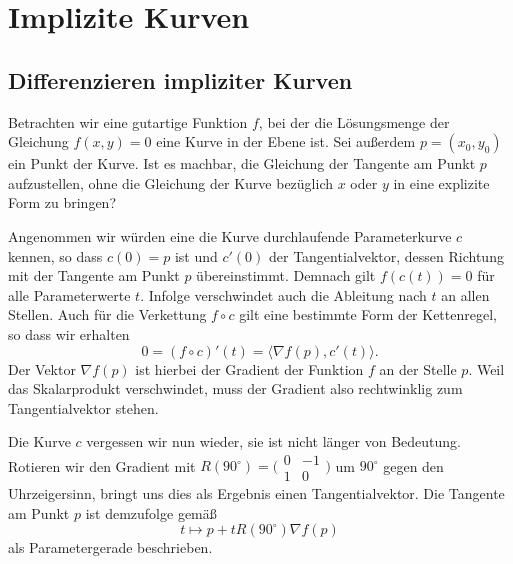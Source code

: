 \newpage
\section{Implizite Kurven}
\subsection{Differenzieren impliziter Kurven}

Betrachten wir eine gutartige Funktion $f$, bei der die Lösungsmenge
der Gleichung $f(x,y)=0$ eine Kurve in der Ebene ist. Sei außerdem
$p=(x_0,y_0)$ ein Punkt der Kurve. Ist es machbar, die Gleichung
der Tangente am Punkt $p$ aufzustellen, ohne die Gleichung der Kurve
bezüglich $x$ oder $y$ in eine explizite Form zu bringen?

Angenommen wir würden eine die Kurve durchlaufende Parameterkurve
$c$ kennen, so dass $c(0)=p$ ist und $c'(0)$ der Tangentialvektor,
dessen Richtung mit der Tangente am Punkt $p$ übereinstimmt.
Demnach gilt $f(c(t))=0$ für alle Parameterwerte $t$. Infolge
verschwindet auch die Ableitung nach $t$ an allen Stellen. Auch
für die Verkettung $f\circ c$ gilt eine bestimmte Form der
Kettenregel, so dass wir erhalten%
\begin{equation}
0 = (f\circ c)'(t) = \langle\nabla f(p), c'(t)\rangle.
\end{equation}
Der Vektor $\nabla f(p)$ ist hierbei der Gradient der Funktion
$f$ an der Stelle $p$. Weil das Skalarprodukt verschwindet,
muss der Gradient also rechtwinklig zum Tangentialvektor stehen.

Die Kurve $c$ vergessen wir nun wieder, sie ist nicht länger
von Bedeutung. Rotieren wir den Gradient mit
$R(90^\circ)=\big(\begin{smallmatrix}0 & -1\\ 1 & 0\end{smallmatrix}\big)$
um $90^\circ$ gegen den Uhrzeigersinn, bringt uns dies als
Ergebnis einen Tangentialvektor. Die Tangente am Punkt $p$ ist
demzufolge gemäß%
\begin{equation}
t\mapsto p + tR(90^\circ)\nabla f(p)
\end{equation}
als Parametergerade beschrieben.

